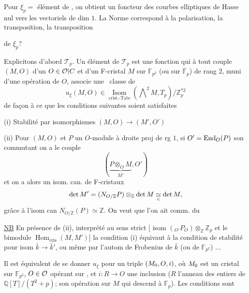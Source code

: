 Pour $\xi_p=$ élément de , on obtient un foncteur  des courbes elliptiques de Hasse nul vers les vectoriels  de dim $1$.
La  Norme correspond à la polarisation, la transposition, la transposition


 de $\xi_p$?

Explicitons d'abord $\mathcal T_p$. Un élément \inserted{$\xi$} de $\mathcal T_p$ est une fonction qui à tout couple $(M,O)$ d'un $O\in\mathcal O|C$ et d'un F-cristal $M$ sur $\mathbb F_{p^2}$ (ou sur $\overline{\mathbb F}_p$) de rang $2$, muni d'une opération de $O$, associe une \ classe de
\[
u_\xi(M,O)\in
\underset{\text{crist.-Tate}}{\operatorname{Isom}}(\mathop{\bigwedge}\nolimits^2 M,T_p)/
\mathbb Z_p^{*2}
\]
de façon à ce que les conditions suivantes soient satisfaites

(i) Stabilité par isomorphismes $(M,O)\longrightarrow(M',O')$

(ii) Pour $(M,O)$ et $P$ un $O$-module à droite proj de rg $1$, si $O'=\operatorname{End}_O(P)$  son commutant on a le couple
\[
(\underbrace{P\otimes_O M}_{M'},O')
\]
et on a alors un isom. can. de F-cristaux
\[
\det M'=(N_{O/\mathbb Z}P)\otimes_{\mathbb Z}\det M
\underset{c}{\simeq}\det M,
\]
grâce à l'isom can $N_{O/\mathbb Z}(P)\simeq\mathbb Z$.
On veut que l'on ait comm. du

\uline{NB} En présence de (ii),  interprété au sens strict
$[$
isom  
$({}_{O'}P_O)\otimes_{\mathbb Z}\mathbb Z_p$
et le bimodule $\operatorname{Hom}_{\mathrm{cris}}(M,M')$]
la condition (i) équivaut à la condition de stabilité pour isom
$\bar k\longrightarrow\bar k'$, ou même par l'autom de Frobenius de $\bar k$ (ou de $\mathbb F_{p^2}$) $\ldots$


Il est équivalent de se donner  $u_\xi$ pour un triple
$(M_{0},O,i)$, où 
$M_{0}$ est un cristal sur $\mathbb F_{p^2}$,
$O\in\mathcal O$ 
opérant sur ,
et $i:R\longrightarrow O$ une inclusion
($R$ l'anneau des entiers de $\mathbb Q[T]/(T^2+p)$;
 son opération sur $M$ qui descend à $\mathbb F_p$).
Les conditions sont

